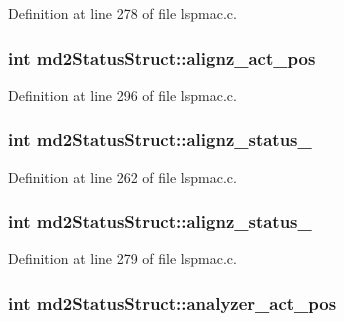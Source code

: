 Definition at line 278 of file lspmac.\-c.

\hypertarget{structmd2StatusStruct_a480f892fe91b05b2980fb00064807e2b}{
\subsubsection[{alignz\-\_\-act\-\_\-pos}]{\setlength{\rightskip}{0pt plus 5cm}int md2\-Status\-Struct\-::alignz\-\_\-act\-\_\-pos}}\label{structmd2StatusStruct_a480f892fe91b05b2980fb00064807e2b}


Definition at line 296 of file lspmac.\-c.

\hypertarget{structmd2StatusStruct_aadbfac5709de57e449a37e2937d6ade7}{
\subsubsection[{alignz\-\_\-status\-\_\-1}]{\setlength{\rightskip}{0pt plus 5cm}int md2\-Status\-Struct\-::alignz\-\_\-status\-\_}}\label{structmd2StatusStruct_aadbfac5709de57e449a37e2937d6ade7}


Definition at line 262 of file lspmac.\-c.

\hypertarget{structmd2StatusStruct_ac378da16eeaab2bc47f3f8f88f7411ed}{
\subsubsection[{alignz\-\_\-status\-\_\-2}]{\setlength{\rightskip}{0pt plus 5cm}int md2\-Status\-Struct\-::alignz\-\_\-status\-\_}}\label{structmd2StatusStruct_ac378da16eeaab2bc47f3f8f88f7411ed}


Definition at line 279 of file lspmac.\-c.

\hypertarget{structmd2StatusStruct_a49d1151b0e819646587be0ca9c9d612a}{
\subsubsection[{analyzer\-\_\-act\-\_\-pos}]{\setlength{\rightskip}{0pt plus 5cm}int md2\-Status\-Struct\-::analyzer\-\_\-act\-\_\-pos}}\label{structmd2StatusStruct_a49d1151b0e819646587be0ca9c9d612a}


